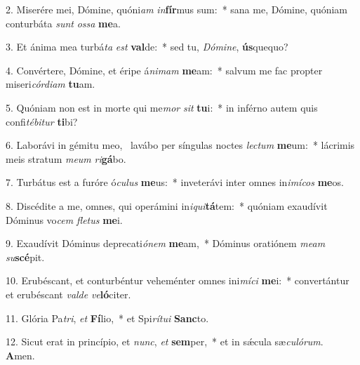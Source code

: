 2. Miserére mei, Dómine, quóni\textit{am} \textit{in}\textbf{fír}mus sum:~*  sana me, Dómine, quóniam conturbáta \textit{sunt} \textit{os}\textit{sa} \textbf{me}a.\

3. Et ánima mea turbá\textit{ta} \textit{est} \textbf{val}de:~*  sed tu, \textit{Dó}\textit{mi}\textit{ne}, \textbf{ús}quequo?\

4. Convértere, Dómine, et éripe á\textit{ni}\textit{mam} \textbf{me}am:~*  salvum me fac propter miseri\textit{cór}\textit{di}\textit{am} \textbf{tu}am.\

5. Quóniam non est in morte qui me\textit{mor} \textit{sit} \textbf{tu}i:~*  in inférno autem quis confi\textit{té}\textit{bi}\textit{tur} \textbf{ti}bi?\

6. Laborávi in gémitu meo, \dag\  lavábo per síngulas noctes \textit{lec}\textit{tum} \textbf{me}um:~*  lácrimis meis stratum \textit{me}\textit{um} \textit{ri}\textbf{gá}bo.\

7. Turbátus est a furóre ó\textit{cu}\textit{lus} \textbf{me}us:~*  inveterávi inter omnes in\textit{i}\textit{mí}\textit{cos} \textbf{me}os.\

8. Discédite a me, omnes, qui operámini in\textit{i}\textit{qui}\textbf{tá}tem:~*  quóniam exaudívit Dóminus vo\textit{cem} \textit{fle}\textit{tus} \textbf{me}i.\

9. Exaudívit Dóminus deprecati\textit{ó}\textit{nem} \textbf{me}am,~*  Dóminus oratiónem \textit{me}\textit{am} \textit{su}\textbf{scé}pit.\

10. Erubéscant, et conturbéntur veheménter omnes ini\textit{mí}\textit{ci} \textbf{me}i:~*  convertántur et erubéscant \textit{val}\textit{de} \textit{ve}\textbf{ló}citer.\

11. Glória Pa\textit{tri}, \textit{et} \textbf{Fí}lio,~*  et Spi\textit{rí}\textit{tu}\textit{i} \textbf{Sanc}to.\

12. Sicut erat in princípio, et \textit{nunc}, \textit{et} \textbf{sem}per,~*  et in sǽcula sæ\textit{cu}\textit{ló}\textit{rum}. \textbf{A}men.\

